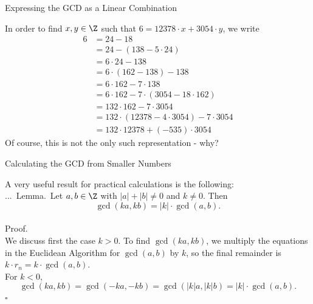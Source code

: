 \documentclass[smaller,hyperref={CJKbookmarks=true}]{beamer}
\newenvironment{PROOF}{{\noindent\!\sf\alert{Proof.}}\\}{\hfill$\square$\\}
\newcounter{zhuo}[subsection]
\renewcommand{\thezhuo}{\thesection.\thesubsection.\arabic{zhuo}}
\newenvironment{LEMMA}{\stepcounter{zhuo}\alert{\thezhuo.~Lemma.\,}}{}
\begin{document}
\begin{frame}[t]{Expressing the GCD as a Linear Combination}
\begin{spacing}{1.1}
In order to find $x,y\in\Z$ such that $6=12378\cdot x+3054\cdot y$, we write
\begin{equation*}
  \begin{split}
     6 &=24-18 \\
       &=24-(138-5\cdot24) \\
       &=6\cdot24-138 \\
       &=6\cdot(162-138)-138 \\
       &=6\cdot162-7\cdot138 \\
       &=6\cdot162-7\cdot(3054-18\cdot162) \\
       &=132\cdot162-7\cdot3054 \\
       &=132\cdot(12378-4\cdot3054)-7\cdot3054 \\
       &=132\cdot12378+(-535)\cdot3054
  \end{split}
\end{equation*}
Of course, this is not the only such representation - why?
\end{spacing}
\end{frame}
\begin{frame}[t]{Calculating the GCD from Smaller Numbers}
\begin{spacing}{1.05}
A very useful result for practical calculations is the following:\\[4pt]
\begin{LEMMA}
Let $a,b\in\Z$ with $|a|+|b|\neq0$ and $k\neq0$. Then
\[\gcd(ka,kb)=|k|\cdot\gcd(a,b).\]
\end{LEMMA}
 \\[6pt]
\begin{PROOF}
We discuss first the case $k>0$. To find $\gcd(ka,kb)$, we multiply the equations in the Euclidean Algorithm for $\gcd(a,b)$ by $k$, so the final remainder is $k\cdot r_n=k\cdot\gcd(a,b)$.\\[4pt]
For $k<0$,
\[\gcd(ka,kb)=\gcd(-ka,-kb)=\gcd(|k|a,|k|b)=|k|
\cdot\gcd(a,b).\]
\end{PROOF}
\end{spacing}
\end{frame}
\end{document}
